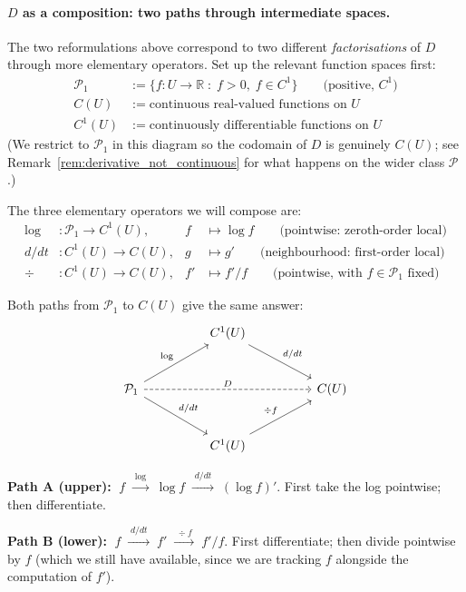 \documentclass[a4paper,oneside,12pt]{extarticle}
\theoremstyle{plain}
\theoremstyle{definition}
\theoremstyle{remark}
\begin{document}
\paragraph{$D$ as a composition: two paths through intermediate spaces.}
The two reformulations above correspond to two different
\emph{factorisations} of $D$ through more elementary operators.  Set
up the relevant function spaces first:
\begin{align*}
  \mathcal{P}_1 &:= \{f: U\to\mathbb{R} \;:\; f>0,\; f\in C^1\}
   \qquad \text{(positive, } C^1 \text{)}\\
  C(U) &:= \text{continuous real-valued functions on } U\\
  C^1(U) &:= \text{continuously differentiable functions on } U
\end{align*}
(We restrict to $\mathcal{P}_1$ in this diagram so the codomain of
$D$ is genuinely $C(U)$; see Remark~\ref{rem:derivative_not_continuous}
for what happens on the wider class $\mathcal{P}$.)

The three elementary operators we will compose are:
\begin{align*}
  \log&: \mathcal{P}_1 \to C^1(U), & f &\mapsto \log f \qquad
    \text{(pointwise: zeroth-order local)}\\
  d/dt&: C^1(U) \to C(U), & g &\mapsto g'  \qquad
    \text{(neighbourhood: first-order local)}\\
  \div&: C^1(U) \to C(U), & f' &\mapsto f'/f
    \qquad \text{(pointwise, with $f\in\mathcal{P}_1$ fixed)}
\end{align*}

Both paths from $\mathcal{P}_1$ to $C(U)$ give the same answer:
\[
\begin{tikzcd}[row sep=large, column sep=huge]
  & C^1(U) \arrow[dr, "d/dt"] & \\
  \mathcal{P}_1 \arrow[ur, "\log"] \arrow[dr, "d/dt"', swap] \arrow[rr, "D", dashed] & & C(U) \\
  & C^1(U) \arrow[ur, "\,\div f"', swap] &
\end{tikzcd}
\]

\textbf{Path A (upper):}
$\;f \;\xrightarrow{\;\log\;}\; \log f \;\xrightarrow{\;d/dt\;}\; (\log f)'.$
First take the log pointwise; then differentiate.

\textbf{Path B (lower):}
$\;f \;\xrightarrow{\;d/dt\;}\; f' \;\xrightarrow{\;\div f\;}\; f'/f.$
First differentiate; then divide pointwise by $f$ (which we still
have available, since we are tracking $f$ alongside the computation
of $f'$).
\end{document}
